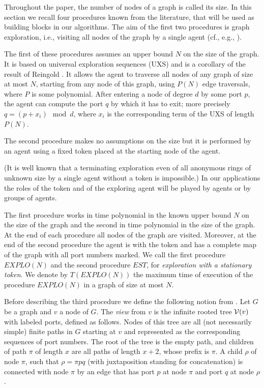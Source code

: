 \documentclass[11pt]{article}
\newcommand{\cV}{{\cal V}}
\begin{document}
Throughout the paper, 
the number of nodes of a graph is called its size.
In this section we recall four procedures known from the literature, that will be used as building blocks in our algorithms. 
The aim of the first two procedures is graph exploration, i.e., visiting all nodes of the graph by a single agent (cf., e.g., \cite{CDK,Re}). 

{The first of these procedures assumes an upper bound $N$ on the size of the graph. It is based on universal exploration sequences (UXS) and is a corollary of the result of Reingold \cite{Re}. It allows the agent to traverse all nodes of any graph of size at most $N$, starting from any node of this graph, using $P(N)$ edge traversals, where $P$ is some polynomial. After entering a node of degree $d$ by some port $p$,
the agent can compute the port $q$ by which it has to exit; more precisely $q=(p+x_i)\mod d$, where $x_i$ is the corresponding term of the UXS of length $P(N)$. 

The second procedure makes no assumptions on the size but 
it is performed by an agent using a fixed token placed at the starting node of the agent.}
(It is well known that a terminating exploration even of all anonymous rings of unknown size by a single agent without a token is impossible.)
In our applications the roles of the token and of the exploring agent will be played by agents or by groups of agents.

The first procedure works in time polynomial in the known upper bound $N$ on the size of the graph and the second in time polynomial in the size of the graph. At the end of each procedure all nodes of the graph are visited.
Moreover, at the end of the second procedure the agent is with the token and has a complete map of the graph with all port numbers marked.
We call the first procedure $EXPLO(N)$ and the second procedure $EST$, for {\em exploration with a stationary token}.
{We denote by $T(EXPLO(N))$ the maximum time of execution of the procedure  $EXPLO(N)$
in a graph of size at most $N$.} 







Before describing the third procedure we define the
following notion from \cite{YK3}. Let $G$ be a graph and $v$ a node of $G$.  
The {\em view} from $v$ is the infinite rooted tree $\cV(v)$ with labeled ports, defined as follows.
Nodes of this tree are all (not necessarily simple) finite paths in $G$ starting at $v$ and represented as the corresponding sequences of port numbers.
The root of the tree is the empty path, and children of path $\pi$ of length $x$ are all paths of length $x+2$, whose prefix is $\pi$.
A child $\rho$ of node $\pi$, such that $\rho=\pi pq$ (with juxtaposition standing for concatenation) is connected with node $\pi$ by an edge
that has port $p$ at node $\pi$ and port $q$ at node $\rho$.
\end{document}
